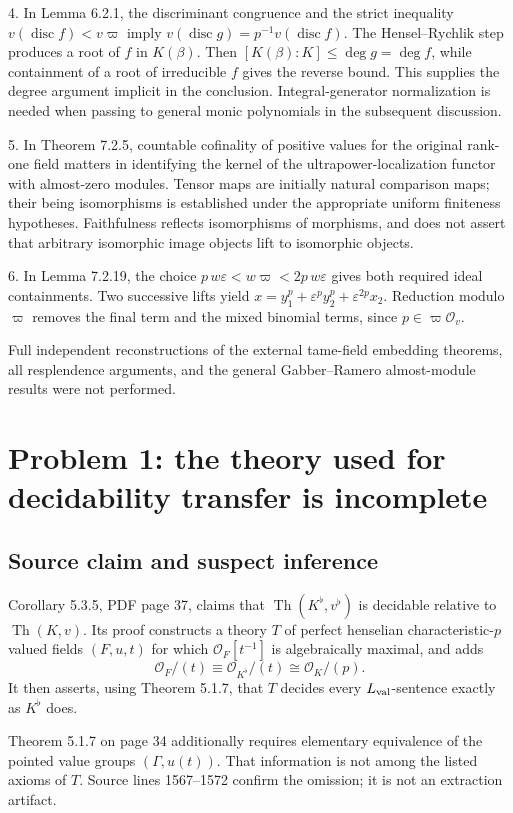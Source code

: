 \documentclass[10pt]{article}
\begin{document}
4. In Lemma 6.2.1, the discriminant congruence and the strict inequality \(v(\operatorname{disc}f)<v\varpi\) imply \(v(\operatorname{disc}g)=p^{-1}v(\operatorname{disc}f)\). The Hensel–Rychlik step produces a root of \(f\) in \(K(\beta)\). Then \([K(\beta):K]\leq\deg g=\deg f\), while containment of a root of irreducible \(f\) gives the reverse bound. This supplies the degree argument implicit in the conclusion. Integral-generator normalization is needed when passing to general monic polynomials in the subsequent discussion.\par
5. In Theorem 7.2.5, countable cofinality of positive values for the original rank-one field matters in identifying the kernel of the ultrapower-localization functor with almost-zero modules. Tensor maps are initially natural comparison maps; their being isomorphisms is established under the appropriate uniform finiteness hypotheses. Faithfulness reflects isomorphisms of morphisms, and does not assert that arbitrary isomorphic image objects lift to isomorphic objects.\par
6. In Lemma 7.2.19, the choice \(p\,w\varepsilon<w\varpi<2p\,w\varepsilon\) gives both required ideal containments. Two successive lifts yield \(x=y_1^p+\varepsilon^p y_2^p+\varepsilon^{2p}x_2\). Reduction modulo \(\varpi\) removes the final term and the mixed binomial terms, since \(p\in\varpi\mathcal O_v\).\par
Full independent reconstructions of the external tame-field embedding theorems, all resplendence arguments, and the general Gabber–Ramero almost-module results were not performed.\par
\section*{Problem 1: the theory used for decidability transfer is incomplete}
\subsection*{Source claim and suspect inference}
Corollary 5.3.5, PDF page 37, claims that \(\operatorname{Th}(K^\flat,v^\flat)\) is decidable relative to \(\operatorname{Th}(K,v)\). Its proof constructs a theory \(T\) of perfect henselian characteristic-\(p\) valued fields \((F,u,t)\) for which \(\mathcal O_F[t^{-1}]\) is algebraically maximal, and adds \[\mathcal O_F/(t)\equiv\mathcal O_{K^\flat}/(t)\cong\mathcal O_K/(p).
 \tag{3.1}\] It then asserts, using Theorem 5.1.7, that \(T\) decides every \(L_{\rm val}\)-sentence exactly as \(K^\flat\) does.\par
Theorem 5.1.7 on page 34 additionally requires elementary equivalence of the pointed value groups \((\Gamma,u(t))\). That information is not among the listed axioms of \(T\). Source lines 1567–1572 confirm the omission; it is not an extraction artifact.\par
\end{document}
